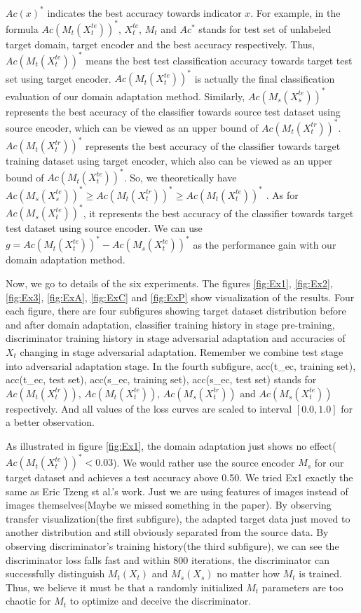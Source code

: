 \documentclass[conference]{IEEEtran}
\begin{document}
$Ac(x)^*$ indicates the best accuracy towards indicator $x$. For example, in the formula $Ac(M_t(X^{te}_t))^*$, $X^{te}_t$, $M_t$ and $Ac^*$ stands for test set of unlabeled target domain, target encoder and the best accuracy respectively. Thus, $Ac(M_t(X^{te}_t))^*$ means the best test classification accuracy towards target test set using target encoder. $Ac(M_t(X^{te}_t))^*$ is actually the final classification evaluation of our domain adaptation method. Similarly, $Ac(M_s(X^{te}_s))^*$ represents the best accuracy of the classifier towards source test dataset using source encoder, which can be viewed as an upper bound of $Ac(M_t(X^{tr}_t))^*$. $Ac(M_t(X^{tr}_t))^*$ represents the best accuracy of the classifier towards target training dataset using target encoder, which also can be viewed as an upper bound of $Ac(M_t(X^{te}_t))^*$. So, we theoretically have $Ac(M_s(X^{te}_s))^* \geq Ac(M_t(X^{tr}_t))^* \geq Ac(M_t(X^{te}_t))^*$ . As for $Ac(M_s(X^{te}_t))^*$, it represents the best accuracy of the classifier towards target test dataset using source encoder. We can use $g=Ac(M_t(X^{te}_t))^*-Ac(M_s(X^{te}_t))^*$ as the performance gain with our domain adaptation method.

Now, we go to details of the six experiments. The figures \ref{fig:Ex1}, \ref{fig:Ex2}, \ref{fig:Ex3}, \ref{fig:ExA}, \ref{fig:ExC} and \ref{fig:ExP} show visualization of the results. Four each figure, there are four subfigures showing target dataset  distribution before and after domain adaptation, classifier training history in stage pre-training, discriminator training history in stage adversarial adaptation and accuracies of $X_t$ changing in stage adversarial adaptation. Remember we combine test stage into adversarial adaptation stage. In the fourth subfigure, acc(t\_ec, training set), acc(t\_ec, test set), acc(s\_ec, training set), acc(s\_ec, test set) stands for $Ac(M_t(X^{tr}_t))$, $Ac(M_t(X^{te}_t))$, $Ac(M_s(X^{tr}_t))$ and $Ac(M_s(X^{te}_t))$ respectively. And all values of the loss curves are scaled to interval $[0.0, 1.0]$ for a better observation.

As illustrated in figure \ref{fig:Ex1}, the domain adaptation just shows no effect($Ac(M_t(X^{te}_t))^* < 0.03$). We would rather use the source encoder $M_s$ for our target dataset and achieves a test accuracy above 0.50. We tried Ex1 exactly the same as Eric Tzeng st al.'s work. Just we are using features of images instead of images themselves(Maybe we missed something in the paper). By observing transfer visualization(the first subfigure), the adapted target data just moved to another distribution and still obviously separated from the source data. By observing discriminator's training history(the third subfigure), we can see the discriminator loss falls fast and within 800 iterations, the discriminator can successfully distinguish $M_t(X_t)$ and $M_s(X_s)$ no matter how $M_t$ is trained. Thus, we believe it must be that a randomly initialized $M_t$ parameters are too chaotic for $M_t$ to optimize and deceive the discriminator.
\end{document}

